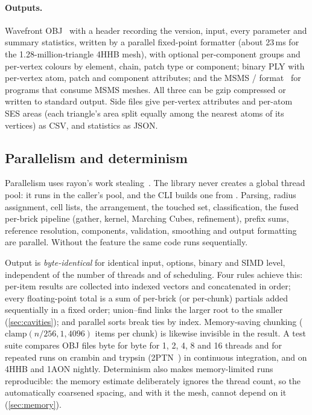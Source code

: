 \paragraph{Outputs.}
Wavefront OBJ~\cite{objformat} with a header recording the version, input,
every parameter and summary statistics, written by a parallel fixed-point
formatter (about 23\,ms for the 1.28-million-triangle 4HHB mesh), with
optional per-component groups and per-vertex colours by element, chain,
patch type or component; binary PLY with per-vertex atom, patch and
component attributes; and the MSMS /
format~\cite{msmsmanual} for programs that consume MSMS meshes. All three
can be gzip compressed or written to standard output. Side files give
per-vertex attributes and per-atom SES areas (each triangle's area split
equally among the nearest atoms of its vertices) as CSV, and statistics as
JSON.

\subsection{Parallelism and determinism}
\label{sec:determinism}

Parallelism uses rayon's work stealing~\cite{rayon}. The library never
creates a global thread pool: it runs in the caller's pool, and the CLI
builds one from . Parsing, radius assignment, cell lists,
the arrangement, the touched set, classification, the fused per-brick
pipeline (gather, kernel, Marching Cubes, refinement), prefix sums,
reference resolution, components, validation, smoothing and output
formatting are parallel. Without the  feature the same code
runs sequentially.

Output is \emph{byte-identical} for identical input, options, binary and
SIMD level, independent of the number of threads and of scheduling. Four
rules achieve this: per-item results are collected into indexed vectors and
concatenated in order; every floating-point total is a sum of per-brick
(or per-chunk) partials added sequentially in a fixed order; union--find
links the larger root to the smaller (\cref{sec:cavities}); and parallel
sorts break ties by index. Memory-saving chunking
($\mathrm{clamp}(n/256, 1, 4096)$ items per chunk) is likewise invisible in
the result. A test suite compares OBJ files byte for byte for 1, 2, 4, 8
and 16 threads and for repeated runs on crambin and trypsin (2PTN~\cite{pdb2ptn}) in
continuous integration, and on 4HHB and 1AON nightly. Determinism also
makes memory-limited runs reproducible: the memory estimate deliberately
ignores the thread count, so the automatically coarsened spacing, and with
it the mesh, cannot depend on it (\cref{sec:memory}).

